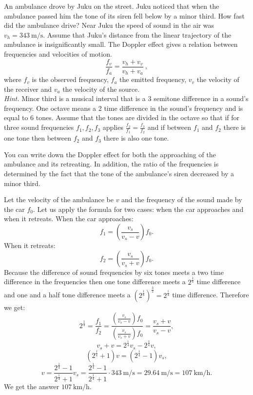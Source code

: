 {\ifEngStatement
An ambulance drove by Juku on the street. Juku noticed that when the ambulance passed him the tone of its siren fell below by a minor third. How fast did the ambulance drive? Near Juku the speed of sound in the air was $v_h = \SI{343}{\meter\per\second}$. Assume that Juku’s distance from the linear trajectory of the ambulance is insignificantly small. The Doppler effect gives a relation between frequencies and velocities of motion.
\[ \frac{f_v}{f_a} = \frac{v_h + v_v}{v_h + v_a} \ , \] 
where \(f_v\) is the observed frequency, \(f_a\) the emitted frequency, \(v_v\) the velocity of the receiver and \(v_a\) the velocity of the source. \\
\emph{Hint.} Minor third is a musical interval that is a 3 semitone difference in a sound’s frequency. One octave means a 2 time difference in the sound’s frequency and is equal to 6 tones. Assume that the tones are divided in the octave so that if for three sound frequencies $f_1, f_2, f_3$ applies $\frac{f_2}{f_1} = \frac{f_3}{f_2}$ and if between $f_1$ and $f_2$ there is one tone then between $f_2$ and $f_3$ there is also one tone.
\fi


\ifEngHint
You can write down the Doppler effect for both the approaching of the ambulance and its retreating. In addition, the ratio of the frequencies is determined by the fact that the tone of the ambulance’s siren decreased by a minor third.
\fi


\ifEngSolution
Let the velocity of the ambulance be $v$ and the frequency of the sound made by the car $f_0$. Let us apply the formula for two cases: when the car approaches and when it retreats. 
When the car approaches:
\[f_1 = \left(\frac{v_s}{v_s - v}\right)f_0.\]
When it retreats:
\[f_2 = \left(\frac{v_s}{v_s + v}\right)f_0.\]
Because the difference of sound frequencies by six tones meets a two time difference in the frequencies then one tone difference meets a $2^{\frac 1 6}$ time difference and one and a half tone difference meets a $\left(2^{\frac 1 6}\right)^{\frac 3 2} = 2^{\frac 1 4}$ time difference. Therefore we get:
\[2^{\frac 1 4} = \frac{f_1}{f_2} = \frac{(\frac{v_s}{v_s - v})f_0}{(\frac{v_s}{v_s + v})f_0} = \frac{v_s + v}{v_s - v},\]
\[v_s + v = 2^{\frac 1 4}v_s - 2^{\frac 1 4}v,\]
\[(2^{\frac 1 4} + 1)v = (2^{\frac 1 4} - 1)v_s,\]
\[v = \frac{2^{\frac 1 4} - 1}{2^{\frac 1 4} + 1}v_s = \frac{2^{\frac 1 4} - 1}{2^{\frac 1 4} + 1} \cdot \SI{343}{\meter\per\second} = \SI{29.64}{\meter\per\second} = \SI{107}{\kilo\meter\per\hour}. \]
We get the answer $\SI{107}{\kilo\meter\per\hour}$.
\fi
}
